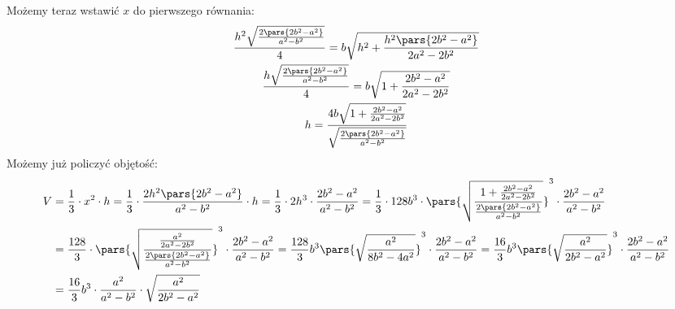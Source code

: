 Możemy teraz wstawić \(x\) do pierwszego równania:
\begin{gather*}
    \frac{h^2\sqrt{\frac{2\pars{2b^2 - a^2}}{a^2 - b^2}}}{4} = b\sqrt{h^2 + \frac{h^2\pars{2b^2 - a^2}}{2a^2 - 2b^2}}\\
    \frac{h\sqrt{\frac{2\pars{2b^2 - a^2}}{a^2 - b^2}}}{4} = b\sqrt{1 + \frac{2b^2 - a^2}{2a^2 - 2b^2}}\\
    h = \frac{4b\sqrt{1 + \frac{2b^2 - a^2}{2a^2 - 2b^2}}}{\sqrt{\frac{2\pars{2b^2 - a^2}}{a^2 - b^2}}}
\end{gather*}
Możemy już policzyć objętość:
\begin{equation*}
    \begin{split}
        V
        &= \frac{1}{3} \cdot x^2 \cdot h
        = \frac{1}{3} \cdot \frac{2h^2\pars{2b^2 - a^2}}{a^2 - b^2} \cdot h
        = \frac{1}{3} \cdot 2h^3 \cdot \frac{2b^2 - a^2}{a^2 - b^2}
        = \frac{1}{3} \cdot 128b^3 \cdot \pars{\sqrt{\frac{1 + \frac{2b^2 - a^2}{2a^2 - 2b^2}}{\frac{2\pars{2b^2 - a^2}}{a^2 - b^2}}}}^3 \cdot \frac{2b^2 - a^2}{a^2 - b^2}\\
        &= \frac{128}{3} \cdot \pars{\sqrt{\frac{\frac{a^2}{2a^2 - 2b^2}}{\frac{2\pars{2b^2 - a^2}}{a^2 - b^2}}}}^3 \cdot \frac{2b^2 - a^2}{a^2 - b^2}
        = \frac{128}{3}b^3\pars{\sqrt{\frac{a^2}{8b^2 - 4a^2}}}^3 \cdot \frac{2b^2 - a^2}{a^2 - b^2}
        = \frac{16}{3}b^3\pars{\sqrt{\frac{a^2}{2b^2 - a^2}}}^3 \cdot \frac{2b^2 - a^2}{a^2 - b^2}\\
        &= \frac{16}{3}b^3 \cdot \frac{a^2}{a^2 - b^2} \cdot \sqrt{\frac{a^2}{2b^2 - a^2}}
    \end{split}
\end{equation*}

